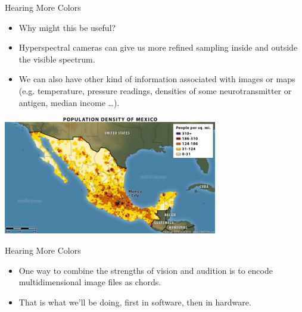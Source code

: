 \documentclass{beamer}
\begin{document}
\begin{frame}{Hearing More Colors}
   \begin{itemize}
      \item Why might this be useful?
      \item Hyperspectral cameras can give us more refined sampling inside and outside the visible spectrum.
      \item We can also have other kind of information associated with images or maps (e.g. temperature, pressure readings, densities of some neurotransmitter or antigen, median income \ldots).
   \end{itemize}
   \begin{center}
      \includegraphics[width=0.7\textwidth]{figures/mexicodensity.jpg}
   \end{center}
\end{frame}

\begin{frame}{Hearing More Colors}
   \begin{itemize}
      \item One way to combine the strengths of vision and audition is to encode multidimensional image files as chords.
      \item That is what we'll be doing, first in software, then in hardware.
   \end{itemize}
\end{frame}
\end{document}
